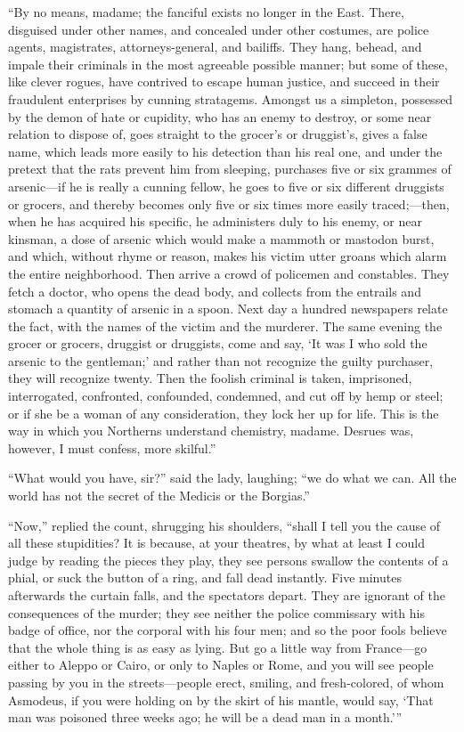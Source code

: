 “By no means, madame; the fanciful exists no longer in the East. There,
disguised under other names, and concealed under other costumes, are
police agents, magistrates, attorneys-general, and bailiffs. They hang,
behead, and impale their criminals in the most agreeable possible
manner; but some of these, like clever rogues, have contrived to escape
human justice, and succeed in their fraudulent enterprises by cunning
stratagems. Amongst us a simpleton, possessed by the demon of hate or
cupidity, who has an enemy to destroy, or some near relation to dispose
of, goes straight to the grocer’s or druggist’s, gives a false name,
which leads more easily to his detection than his real one, and under
the pretext that the rats prevent him from sleeping, purchases five or
six grammes of arsenic—if he is really a cunning fellow, he goes to
five or six different druggists or grocers, and thereby becomes only
five or six times more easily traced;—then, when he has acquired his
specific, he administers duly to his enemy, or near kinsman, a dose of
arsenic which would make a mammoth or mastodon burst, and which,
without rhyme or reason, makes his victim utter groans which alarm the
entire neighborhood. Then arrive a crowd of policemen and constables.
They fetch a doctor, who opens the dead body, and collects from the
entrails and stomach a quantity of arsenic in a spoon. Next day a
hundred newspapers relate the fact, with the names of the victim and
the murderer. The same evening the grocer or grocers, druggist or
druggists, come and say, ‘It was I who sold the arsenic to the
gentleman;’ and rather than not recognize the guilty purchaser, they
will recognize twenty. Then the foolish criminal is taken, imprisoned,
interrogated, confronted, confounded, condemned, and cut off by hemp or
steel; or if she be a woman of any consideration, they lock her up for
life. This is the way in which you Northerns understand chemistry,
madame. Desrues was, however, I must confess, more skilful.”

“What would you have, sir?” said the lady, laughing; “we do what we
can. All the world has not the secret of the Medicis or the Borgias.”

“Now,” replied the count, shrugging his shoulders, “shall I tell you
the cause of all these stupidities? It is because, at your theatres, by
what at least I could judge by reading the pieces they play, they see
persons swallow the contents of a phial, or suck the button of a ring,
and fall dead instantly. Five minutes afterwards the curtain falls, and
the spectators depart. They are ignorant of the consequences of the
murder; they see neither the police commissary with his badge of
office, nor the corporal with his four men; and so the poor fools
believe that the whole thing is as easy as lying. But go a little way
from France—go either to Aleppo or Cairo, or only to Naples or Rome,
and you will see people passing by you in the streets—people erect,
smiling, and fresh-colored, of whom Asmodeus, if you were holding on by
the skirt of his mantle, would say, ‘That man was poisoned three weeks
ago; he will be a dead man in a month.’”

